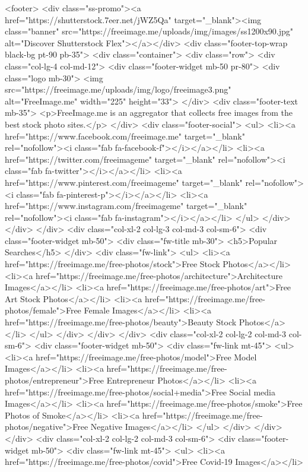<footer>
<div class="ss-promo"><a href="https://shutterstock.7eer.net/jWZ5Qa" target="_blank"><img class="banner" src="https://freeimage.me/uploads/img/images/ss1200x90.jpg" alt="Discover Shutterstock Flex"></a></div>
<div class="footer-top-wrap black-bg pt-90 pb-35">
<div class="container">
<div class="row">
<div class="col-lg-4 col-md-12">
<div class="footer-widget mb-50 pr-80">
<div class="logo mb-30">
<img src="https://freeimage.me/uploads/img/logo/freeimage3.png" alt="FreeImage.me" width="225" height="33">
</div>
<div class="footer-text mb-35">
<p>FreeImage.me is an aggregator that collects free images from the best stock photo sites.</p>
</div>
<div class="footer-social">
<ul>
<li><a href="https://www.facebook.com/freeimage.me" target="_blank" rel="nofollow"><i class="fab fa-facebook-f"></i></a></li>
<li><a href="https://twitter.com/freeimageme" target="_blank" rel="nofollow"><i class="fab fa-twitter"></i></a></li>
<li><a href="https://www.pinterest.com/freeimageme" target="_blank" rel="nofollow"><i class="fab fa-pinterest-p"></i></a></li>
<li><a href="https://www.instagram.com/freeimageme" target="_blank" rel="nofollow"><i class="fab fa-instagram"></i></a></li>
</ul>
</div>
</div>
</div>
<div class="col-xl-2 col-lg-3 col-md-3 col-sm-6">
<div class="footer-widget mb-50">
<div class="fw-title mb-30">
<h5>Popular Searches</h5>
</div>
<div class="fw-link">
<ul>
<li><a href="https://freeimage.me/free-photos/stock">Free Stock Photos</a></li>
<li><a href="https://freeimage.me/free-photos/architecture">Architecture Images</a></li>
 <li><a href="https://freeimage.me/free-photos/art">Free Art Stock Photos</a></li>
<li><a href="https://freeimage.me/free-photos/female">Free Female Images</a></li>
<li><a href="https://freeimage.me/free-photos/beauty">Beauty Stock Photos</a></li>
</ul>
</div>
</div>
</div>
<div class="col-xl-2 col-lg-2 col-md-3 col-sm-6">
<div class="footer-widget mb-50">
<div class="fw-link mt-45">
<ul>
<li><a href="https://freeimage.me/free-photos/model">Free Model Images</a></li>
<li><a href="https://freeimage.me/free-photos/entrepreneur">Free Entrepreneur Photos</a></li>
<li><a href="https://freeimage.me/free-photos/social+media">Free Social media Images</a></li>
<li><a href="https://freeimage.me/free-photos/smoke">Free Photos of Smoke</a></li>
<li><a href="https://freeimage.me/free-photos/negative">Free Negative Images</a></li>
</ul>
</div>
</div>
</div>
<div class="col-xl-2 col-lg-2 col-md-3 col-sm-6">
<div class="footer-widget mb-50">
<div class="fw-link mt-45">
<ul>
<li><a href="https://freeimage.me/free-photos/covid">Free Covid-19 Images</a></li>
